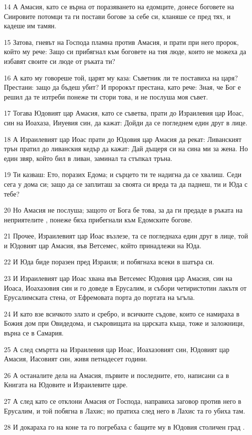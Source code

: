 \par 14 А Амасия, като се върна от поразяването на едомците, донесе боговете на Сиировите потомци та ги постави богове за себе си, кланяше се пред тях, и кадеше им тамян.
\par 15 Затова, гневът на Господа пламна против Амасия, и прати при него пророк, който му рече: Защо си прибягнал към боговете на тия люде, които не можеха да избавят своите си люде от ръката ти?
\par 16 А като му говореше той, царят му каза: Съветник ли те поставиха на царя? Престани: защо да бъдеш убит? И пророкът престана, като рече: Зная, че Бог е решил да те изтреби понеже ти стори това, и не послуша моя съвет.
\par 17 Тогава Юдовият цар Амасия, като се съветва, прати до Израилевия цар Иоас, син на Иоахаза, Ииуевия син, да кажат: Дойди да се погледнем един друг в лице.
\par 18 А Израилевият цар Иоас прати до Юдовия цар Амасия да рекат: Ливанският трън пратил до ливанския кедър да кажат: Дай дъщеря си на сина ми за жена. Но един звяр, който бил в ливан, заминал та стъпкал тръна.
\par 19 Ти казваш: Ето, поразих Едома; и сърцето ти те надигна да се хвалиш. Седи сега у дома си; защо да се заплиташ за своята си вреда та да паднеш, ти и Юда с тебе?
\par 20 Но Амасия не послуша; защото от Бога бе това, за да ги предаде в ръката на неприятелите , понеже бяха прибегнали към Едомските богове.
\par 21 Прочее, Израилевият цар Иоас възлезе, та се погледнаха един друг в лице, той и Юдовият цар Амасия, във Ветсемес, който принадлежи на Юда.
\par 22 И Юда биде поразен пред Израиля; и побягнаха всеки в шатъра си.
\par 23 И Израилевият цар Иоас хвана във Ветсемес Юдовия цар Амасия, син на Иоаса, Иоахазовия син и го доведе в Ерусалим, и събори четиристотин лакътя от Ерусалимската стена, от Ефремовата порта до портата на ъгъла.
\par 24 И като взе всичкото злато и сребро, и всичките съдове, които се намираха в Божия дом при Овидедома, и съкровищата на царската къща, тоже и заложници, върна се в Самария.
\par 25 А след смъртта на Израилевия цар Иоас, Иоахазовият син, Юдовият цар Амасия, Иасовият син, живя петнадесет години.
\par 26 А останалите дела на Амасия, първите и последните, ето, написани са в Книгата на Юдовите и Израилевите царе.
\par 27 А след като се отклони Амасия от Господа, направиха заговор против него в Ерусалим, и той побягна в Лахис; но пратиха след него в Лахис та го убиха там.
\par 28 И докараха го на коне та го погребаха с бащите му в Юдовия столичен град .

